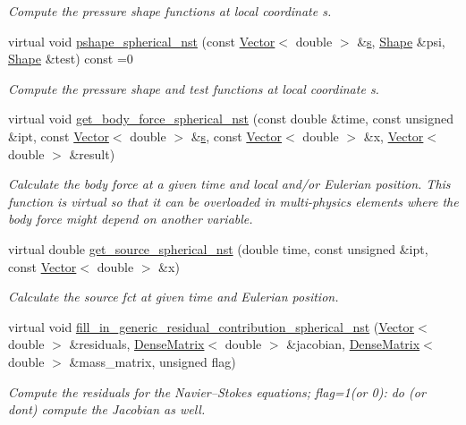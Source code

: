 \begin{DoxyCompactItemize}
\begin{DoxyCompactList}\small\item\em Compute the pressure shape functions at local coordinate s. \end{DoxyCompactList}\item 
virtual void \hyperlink{classoomph_1_1SphericalNavierStokesEquations_a862f1da9ef70c289f4220391443b7d09}{pshape\+\_\+spherical\+\_\+nst} (const \hyperlink{classoomph_1_1Vector}{Vector}$<$ double $>$ \&\hyperlink{cfortran_8h_ab7123126e4885ef647dd9c6e3807a21c}{s}, \hyperlink{classoomph_1_1Shape}{Shape} \&psi, \hyperlink{classoomph_1_1Shape}{Shape} \&test) const =0
\begin{DoxyCompactList}\small\item\em Compute the pressure shape and test functions at local coordinate s. \end{DoxyCompactList}\item 
virtual void \hyperlink{classoomph_1_1SphericalNavierStokesEquations_a6dbdc5a0b33a0f36494ffefed1a938ac}{get\+\_\+body\+\_\+force\+\_\+spherical\+\_\+nst} (const double \&time, const unsigned \&ipt, const \hyperlink{classoomph_1_1Vector}{Vector}$<$ double $>$ \&\hyperlink{cfortran_8h_ab7123126e4885ef647dd9c6e3807a21c}{s}, const \hyperlink{classoomph_1_1Vector}{Vector}$<$ double $>$ \&x, \hyperlink{classoomph_1_1Vector}{Vector}$<$ double $>$ \&result)
\begin{DoxyCompactList}\small\item\em Calculate the body force at a given time and local and/or Eulerian position. This function is virtual so that it can be overloaded in multi-\/physics elements where the body force might depend on another variable. \end{DoxyCompactList}\item 
virtual double \hyperlink{classoomph_1_1SphericalNavierStokesEquations_afac2bf109a54ca1753b3e9eb5b5859ff}{get\+\_\+source\+\_\+spherical\+\_\+nst} (double time, const unsigned \&ipt, const \hyperlink{classoomph_1_1Vector}{Vector}$<$ double $>$ \&x)
\begin{DoxyCompactList}\small\item\em Calculate the source fct at given time and Eulerian position. \end{DoxyCompactList}\item 
virtual void \hyperlink{classoomph_1_1SphericalNavierStokesEquations_acd48b82c748de406c94f8d8eabdfa8f5}{fill\+\_\+in\+\_\+generic\+\_\+residual\+\_\+contribution\+\_\+spherical\+\_\+nst} (\hyperlink{classoomph_1_1Vector}{Vector}$<$ double $>$ \&residuals, \hyperlink{classoomph_1_1DenseMatrix}{Dense\+Matrix}$<$ double $>$ \&jacobian, \hyperlink{classoomph_1_1DenseMatrix}{Dense\+Matrix}$<$ double $>$ \&mass\+\_\+matrix, unsigned flag)
\begin{DoxyCompactList}\small\item\em Compute the residuals for the Navier--Stokes equations; flag=1(or 0)\+: do (or don\textquotesingle{}t) compute the Jacobian as well. \end{DoxyCompactList}\end{DoxyCompactItemize}

